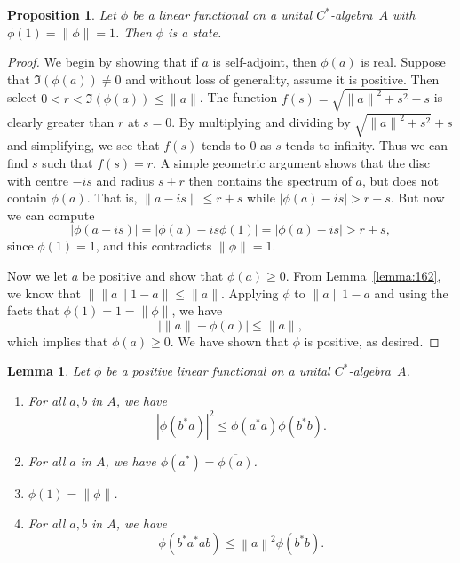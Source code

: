\documentclass{book}
\newtheorem{lemma}[definition]{Lemma}
\newtheorem{proposition}[definition]{Proposition}
\def\cstar{\(C^*\)-algebra}
\begin{document}
\begin{proposition}\label{prop:1122}
  Let \(\phi\) be a linear functional on a unital \cstar\ \(A\)
  with \(\phi(1) = \|\phi\| =1\). Then \(\phi\) is a state.
\end{proposition}
\begin{proof}
  We begin by showing that if \(a\) is self-adjoint, then \(\phi(a)\) is real. Suppose
  that \(\Im(\phi(a))\neq 0\) and without loss of generality, assume it is positive.
  Then select \(0 < r < \Im(\phi(a)) \leq \|a\|\). The function \(f(s) = \sqrt{{\|a\|}^2+s^2}-s\) is
  clearly greater than \(r\) at \(s = 0\). By multiplying and dividing by 
  \(\sqrt{{\|a\|}^2+s^2}+ s\) and simplifying, we see that \(f(s)\) tends to \(0\) as \(s\) tends to infinity. Thus we
  can find \(s\) such that \(f(s) = r\). A simple geometric argument shows that the
  disc with centre \(-is\) and radius \(s + r\) then contains the spectrum of \(a\), but
  does not contain \(\phi(a)\). That is, \(\|a - is\| \leq r +s\) while \(|\phi(a) - is| > r +s\).
  But now we can compute
  \[|\phi(a - is)| = |\phi(a) - is\phi(1)| = |\phi(a) - is| > r +s,\]
  since \(\phi(1) = 1\), and this contradicts \(\|\phi\| = 1\).\par
  Now we let \(a\) be positive and show that \(\phi(a) \geq 0\). From Lemma~\ref{lemma:162},
  we know that \(\|\|a\|1 -a\| \leq \|a\|\). Applying \(\phi\) to \(\|a\|1-a\) and using the facts
  that \(\phi(1) = 1 = \|\phi\|\), we have
  \[|\|a\| -\phi(a)| \leq \|a\|,\]
  which implies that \(\phi(a) \geq 0\). We have shown that \(\phi\) is positive, as desired.
\end{proof}
\begin{lemma}
  Let \(\phi\) be a positive linear functional on a unital \cstar\ \(A\).
  \begin{enumerate}
    \item For all \(a,b\) in \(A\), we have
      \[|\phi(b^*a)|^2 \leq \phi(a^*a)\phi(b^*b).\]
    \item For all \(a\) in \(A\), we have \(\phi(a^*) = \overline{\phi(a)}\).
    \item \(\phi(1) = \|\phi\|\).
    \item For all \(a,b\) in \(A\), we have
      \[\phi(b^*a^*ab) \leq {\left\|a\right\|}^2\phi(b^*b).\]
  \end{enumerate}
\end{lemma}
\end{document}
